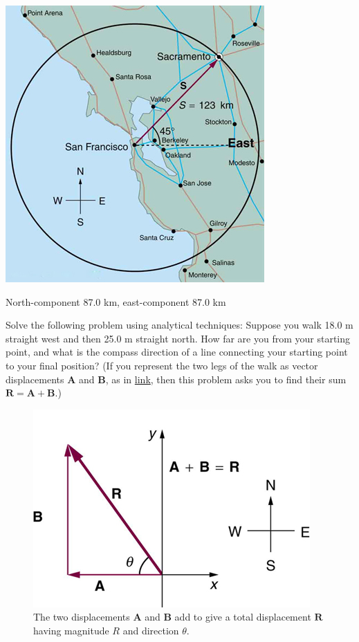 \documentclass[
]{book}
\newenvironment{problems-exercises}{}{}
\begin{document}
\begin{problems-exercises}
\includegraphics{images/Figure_03_02_19a.jpg}

\leavevmode\hypertarget{eip-id2406348}{}%
North-component 87.0 km, east-component 87.0 km

\hypertarget{eip-287}{}
\leavevmode\hypertarget{eip-61}{}%
Solve the following problem using analytical techniques: Suppose you
walk 18.0 m straight west and then 25.0 m straight north. How far are
you from your starting point, and what is the compass direction of a
line connecting your starting point to your final position? (If you
represent the two legs of the walk as vector displacements
\(\mathbf{A}{}\) and \(\mathbf{B}{}\), as in
\protect\hyperlink{import-auto-id1165298935750}{link}, then this
problem asks you to find their sum
\({\mathbf{R} = {\mathbf{A} + \mathbf{B}}}{}\).)

\begin{figure}
\hypertarget{import-auto-id1165298935750}{%
\centering
\includegraphics{images/Figure_03_02_21a.jpg}
\caption{The two displacements \(\mathbf{A}{}\) and \(\mathbf{B}{}\) add to give a
total displacement \(\mathbf{R}{}\) having magnitude \(R{}\) and direction
\(\theta{}\).}\label{import-auto-id1165298935750}
}
\end{figure}


\end{problems-exercises}
\end{document}
